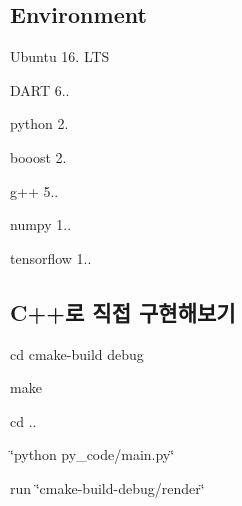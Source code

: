 \subsection*{Environment}


\begin{DoxyItemize}
\item Ubuntu 16. L\+TS
\item D\+A\+RT 6..
\item python 2.
\item booost 2.
\item g++ 5..
\item numpy 1..
\item tensorflow 1..
\end{DoxyItemize}

\subsection*{C++로 직접 구현해보기}


\begin{DoxyEnumerate}
\item cd cmake-\/build debug
\item make
\item cd ..
\item \char`\"{}python py\+\_\+code/main.\+py\char`\"{}
\item run \char`\"{}cmake-\/build-\/debug/render\char`\"{} 
\end{DoxyEnumerate}